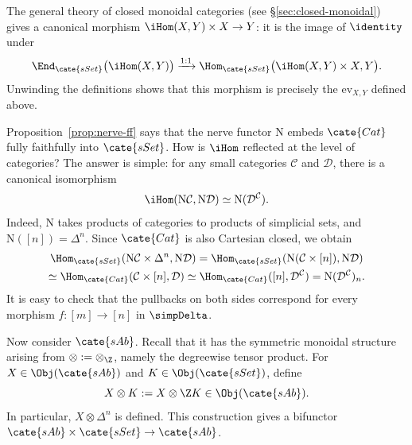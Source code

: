 The general theory of closed monoidal categories (see
\S\ref{sec:closed-monoidal}) gives a canonical morphism
$\iHom(X,Y)\times X\to Y$: it is the image of $\identity$ under
\[
\End_{\cate{sSet}}\bigl(\iHom(X,Y)\bigr)\xrightarrow{1:1}
\Hom_{\cate{sSet}}\bigl(\iHom(X,Y)\times X,Y\bigr).
\]
Unwinding the definitions shows that this morphism is precisely the
$\mathrm{ev}_{X,Y}$ defined above.

\begin{example}
	Proposition~\ref{prop:nerve-ff} says that the nerve functor $\mathrm{N}$
	embeds $\cate{Cat}$ fully faithfully into $\cate{sSet}$. How is $\iHom$
	reflected at the level of categories? The answer is simple: for any small
	categories $\mathcal{C}$ and $\mathcal{D}$, there is a canonical
	isomorphism
	\[
	\iHom(\mathrm{N}\mathcal{C},\mathrm{N}\mathcal{D})
	\simeq\mathrm{N}(\mathcal{D}^{\mathcal{C}}).
	\]
	Indeed, $\mathrm{N}$ takes products of categories to products of
	simplicial sets, and $\mathrm{N}([n])=\Delta^n$. Since $\cate{Cat}$ is
	also Cartesian closed, we obtain
	\begin{multline*}
		\Hom_{\cate{sSet}}(\mathrm{N}\mathcal{C}\times\Delta^n,
		\mathrm{N}\mathcal{D})
		=\Hom_{\cate{sSet}}(\mathrm{N}(\mathcal{C}\times[n]),
		\mathrm{N}\mathcal{D})\\
		\simeq\Hom_{\cate{Cat}}(\mathcal{C}\times[n],\mathcal{D})
		\simeq\Hom_{\cate{Cat}}([n],\mathcal{D}^{\mathcal{C}})
		=\mathrm{N}(\mathcal{D}^{\mathcal{C}})_n.
	\end{multline*}
	It is easy to check that the pullbacks on both sides correspond for every
	morphism $f:[m]\to[n]$ in $\simpDelta$.
\end{example}

Now consider $\cate{sAb}$. Recall that it has the symmetric monoidal
structure arising from $\otimes:=\otimes_{\Z}$, namely the degreewise tensor
product. For $X\in\Obj(\cate{sAb})$ and $K\in\Obj(\cate{sSet})$, define
\[
X\otimes K:=X\otimes\Z K\in\Obj(\cate{sAb}).
\]
In particular, $X\otimes\Delta^n$ is defined. This construction gives a
bifunctor $\cate{sAb}\times\cate{sSet}\to\cate{sAb}$.

